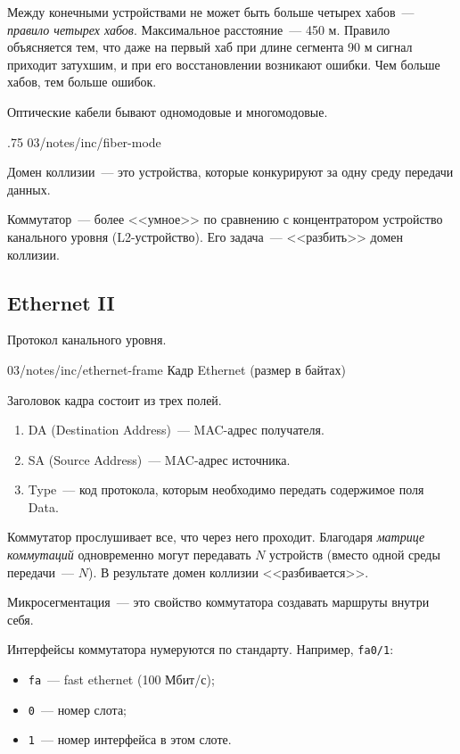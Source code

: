 Между конечными устройствами не может быть больше четырех хабов~--- \textit{правило четырех хабов}. Максимальное расстояние~--- 450 м. Правило объясняется тем, что даже на первый хаб при длине сегмента 90 м сигнал приходит затухшим, и при его восстановлении возникают ошибки. Чем больше хабов, тем больше ошибок.

Оптические кабели бывают одномодовые и многомодовые.

\image
{.75\textwidth}
{03/notes/inc/fiber-mode}
{}

\begin{dd}
    Домен коллизии~--- это устройства, которые конкурируют за одну среду передачи данных.
\end{dd}

Коммутатор~--- более <<умное>> по сравнению с концентратором устройство канального уровня (L2-устройство). Его задача~--- <<разбить>> домен коллизии.

\subsection{Ethernet II}

Протокол канального уровня.

\image
{\textwidth}
{03/notes/inc/ethernet-frame}
{Кадр Ethernet (размер в байтах)}

Заголовок кадра состоит из трех полей.

\begin{enumerate}
    \item DA (Destination Address)~--- MAC-адрес получателя.
    \item SA (Source Address)~--- MAC-адрес источника.
    \item Type~--- код протокола, которым необходимо передать содержимое поля Data.
\end{enumerate}

Коммутатор прослушивает все, что через него проходит. Благодаря \textit{матрице коммутаций} одновременно могут передавать $N$ устройств (вместо одной среды передачи~--- $N$). В результате домен коллизии <<разбивается>>.

\begin{dd}
    Микросегментация~--- это свойство коммутатора создавать маршруты внутри себя.
\end{dd}

Интерфейсы коммутатора нумеруются по стандарту. Например, \texttt{fa0/1}:

\begin{itemize}
    \item \texttt{fa}~--- fast ethernet (100 Мбит/с);
    \item \texttt{0}~--- номер слота;
    \item \texttt{1}~--- номер интерфейса в этом слоте.
\end{itemize}

